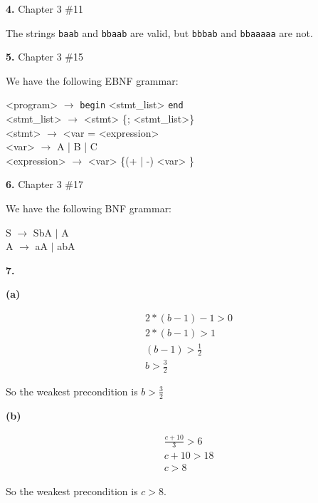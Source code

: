 \documentclass[letterpaper, 11pt]{article}
\newcommand{\hwnumber}[1]{\medskip \noindent\textbf{#1.} \smallskip}
\newcommand{\hwnumbersec}[2]{\medskip \noindent\textbf{#1.} Chapter 3 \##2 \smallskip}
\newcommand{\To}{$\rightarrow$ }
\begin{document}
\newpage
\hwnumbersec{4}{11}

The strings \texttt{baab} and \texttt{bbaab} are valid, but \texttt{bbbab} and
\texttt{bbaaaaa} are not. 

\hwnumbersec{5}{15}

We have the following EBNF grammar:
\medskip

\begin{minipage}{0.8\textwidth}
\centering
\begin{grammar}
	<program> \To \texttt{begin} <stmt_list> \texttt{end}\\
	<stmt_list> \To <stmt> \{; <stmt_list>\}\\
	<stmt> \To <var = <expression>\\
	<var> \To A | B | C\\
	<expression> \To <var> \{(+ | -) <var> \}
\end{grammar}
\end{minipage}

\hwnumbersec{6}{17}

We have the following BNF grammar:
\medskip

\begin{minipage}{0.8\textwidth}
	\centering
	S \To SbA $\vert$ A \\
	A \To aA $\vert$ abA
\end{minipage}

\hwnumber{7}{23(a and b)}

\textbf{(a)}

\begin{align*}
	&2 * (b - 1) - 1 > 0 \\
	&2 * (b - 1) > 1 \\
	&(b - 1) > \frac{1}{2}\\
	&b > \frac{3}{2}
\end{align*}

So the weakest precondition is $b > \frac{3}{2}$
\medskip

\textbf{(b)}

\begin{align*}
	&\frac{c + 10}{3} > 6\\
	&c + 10 > 18 \\
	&c > 8
\end{align*}

So the weakest precondition is $c > 8$.
\end{document}
